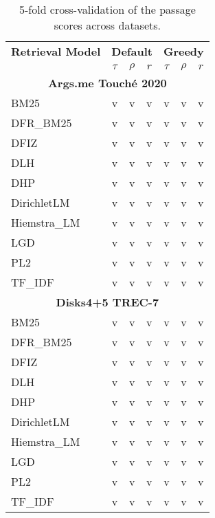 
\pagebreak
\begin{longtable}{lcccccc}
    \caption{5-fold cross-validation of the passage scores across datasets.} \\
    \toprule
    \textbf{Retrieval Model} & \multicolumn{3}{c}{\textbf{Default}} & \multicolumn{3}{c}{\textbf{Greedy}} \\
    \cmidrule(lr){2-4} \cmidrule(lr){5-7}
                            & $\tau$ & $\rho$ & $r$ & $\tau$ & $\rho$ & $r$ \\
    \midrule

    \multicolumn{7}{c}{\textbf{Args.me Touché 2020}} \\
    BM25         & v & v & v & v & v & v \\
    DFR\_BM25    & v & v & v & v & v & v \\
    DFIZ         & v & v & v & v & v & v \\
    DLH          & v & v & v & v & v & v \\
    DHP          & v & v & v & v & v & v \\
    DirichletLM  & v & v & v & v & v & v \\
    Hiemstra\_LM & v & v & v & v & v & v \\
    LGD          & v & v & v & v & v & v \\
    PL2          & v & v & v & v & v & v \\
    TF\_IDF      & v & v & v & v & v & v \\
    \midrule

    \multicolumn{7}{c}{\textbf{Disks4+5 TREC-7}} \\
    BM25         & v & v & v & v & v & v \\
    DFR\_BM25    & v & v & v & v & v & v \\
    DFIZ         & v & v & v & v & v & v \\
    DLH          & v & v & v & v & v & v \\
    DHP          & v & v & v & v & v & v \\
    DirichletLM  & v & v & v & v & v & v \\
    Hiemstra\_LM & v & v & v & v & v & v \\
    LGD          & v & v & v & v & v & v \\
    PL2          & v & v & v & v & v & v \\
    TF\_IDF      & v & v & v & v & v & v \\
    \midrule


\end{longtable}
